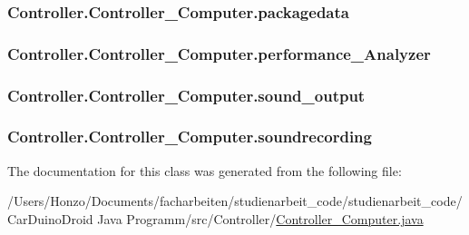 \subsubsection[{packagedata}]{ Controller.\+Controller\+\_\+\+Computer.\+packagedata}\label{class_controller_1_1_controller___computer_ae7ae8b19c54572babe3f871a2407b6d2}
\hypertarget{class_controller_1_1_controller___computer_af8928aa423ec277d4438e8a8b68ed2a7}{}
\subsubsection[{performance\+\_\+\+Analyzer}]{ Controller.\+Controller\+\_\+\+Computer.\+performance\+\_\+\+Analyzer}\label{class_controller_1_1_controller___computer_af8928aa423ec277d4438e8a8b68ed2a7}
\hypertarget{class_controller_1_1_controller___computer_a329b74f7beba3ccdc75f710809c12ae7}{}
\subsubsection[{sound\+\_\+output}]{ Controller.\+Controller\+\_\+\+Computer.\+sound\+\_\+output}\label{class_controller_1_1_controller___computer_a329b74f7beba3ccdc75f710809c12ae7}
\hypertarget{class_controller_1_1_controller___computer_a95c55f8f9f0ca133e4638d5654bfe88d}{}
\subsubsection[{soundrecording}]{ Controller.\+Controller\+\_\+\+Computer.\+soundrecording}\label{class_controller_1_1_controller___computer_a95c55f8f9f0ca133e4638d5654bfe88d}


The documentation for this class was generated from the following file\+:\begin{DoxyCompactItemize}
\item 
/\+Users/\+Honzo/\+Documents/facharbeiten/studienarbeit\+\_\+code/studienarbeit\+\_\+code/\+Car\+Duino\+Droid Java Programm/src/\+Controller/\hyperlink{_controller___computer_8java}{Controller\+\_\+\+Computer.\+java}\end{DoxyCompactItemize}
